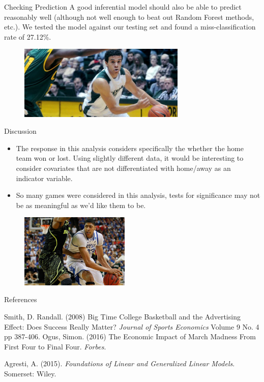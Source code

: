 \documentclass{beamer}
\begin{document}
\begin{frame}{Checking Prediction}
A good inferential model should also be able to predict reasonably well (although not well enough to beat out Random Forest methods, etc.). We tested the model against our testing set and found a miss-classification rate of 27.12\%. 
\begin{figure}
	\centering
	\includegraphics[height = 100pt]{dorian.jpg}
	\end{figure}
\end{frame}

\begin{frame}{Discussion}
\begin{itemize}
\item The response in this analysis considers specifically the whether the home team won or lost. Using slightly different data, it would be interesting to consider covariates that are not differentiated with home/away as an indicator variable.  

\item So many games were considered in this analysis, tests for significance may not be as meaningful as we'd like them to be. 
\end{itemize}
\begin{figure}
	\centering
	\includegraphics[height = 100pt]{unibrow.jpg}
\end{figure}
\end{frame}

\begin{frame}{References}
\begin{thebibliography}{4}
Smith, D. Randall. (2008) Big Time College Basketball and the Advertising Effect: Does Success Really Matter? \textit{Journal of Sports Economics} Volume 9 No. 4 pp 387-406.
Ogus, Simon. (2016) The Economic Impact of March Madness From First Four to Final Four. \textit{Forbes}. 

Agresti, A. (2015). \textit{Foundations of Linear and Generalized Linear Models}. Somerset: Wiley.
\end{thebibliography}

\end{frame}
	
\end{document}
